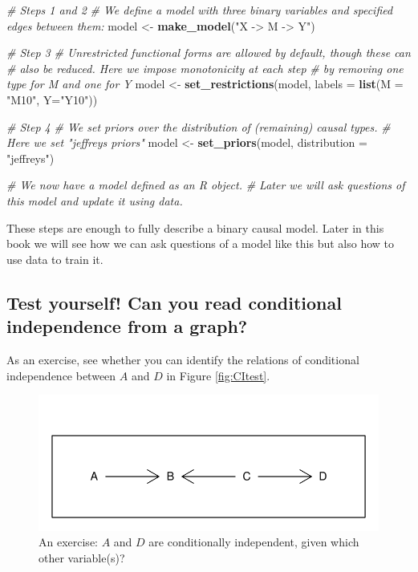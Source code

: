 \documentclass[12pt,]{book}
\newenvironment{Shaded}{\begin{snugshade}}{\end{snugshade}}
\newcommand{\CommentTok}[1]{\textcolor[rgb]{0.56,0.35,0.01}{\textit{#1}}}
\newcommand{\DataTypeTok}[1]{\textcolor[rgb]{0.13,0.29,0.53}{#1}}
\newcommand{\KeywordTok}[1]{\textcolor[rgb]{0.13,0.29,0.53}{\textbf{#1}}}
\newcommand{\NormalTok}[1]{#1}
\newcommand{\StringTok}[1]{\textcolor[rgb]{0.31,0.60,0.02}{#1}}
\begin{document}
\begin{Shaded}
\begin{Highlighting}[]
\CommentTok{# Steps 1 and 2 }
\CommentTok{# We define a model with three binary variables and specified edges between them:}
\NormalTok{model <-}\StringTok{ }\KeywordTok{make_model}\NormalTok{(}\StringTok{"X -> M -> Y"}\NormalTok{)}

\CommentTok{# Step 3}
\CommentTok{# Unrestricted functional forms are allowed by default, though these can }
\CommentTok{# also be reduced. Here we impose monotonicity at each step }
\CommentTok{# by removing one type for M and one for Y}
\NormalTok{model <-}\StringTok{ }\KeywordTok{set_restrictions}\NormalTok{(model, }\DataTypeTok{labels =} \KeywordTok{list}\NormalTok{(}\DataTypeTok{M =} \StringTok{"M10"}\NormalTok{, }\DataTypeTok{Y=}\StringTok{"Y10"}\NormalTok{))}

\CommentTok{# Step 4}
\CommentTok{# We set priors over the distribution of (remaining) causal types.}
\CommentTok{# Here we set "jeffreys priors"}
\NormalTok{model <-}\StringTok{ }\KeywordTok{set_priors}\NormalTok{(model, }\DataTypeTok{distribution =} \StringTok{"jeffreys"}\NormalTok{)}

\CommentTok{# We now have a model defined as an R object. }
\CommentTok{# Later we will ask questions of this model and update it using data.}
\end{Highlighting}
\end{Shaded}

These steps are enough to fully describe a binary causal model. Later in this book we will see how we can ask questions of a model like this but also how to use data to train it.

\hypertarget{test-yourself-can-you-read-conditional-independence-from-a-graph}{%
\subsection{Test yourself! Can you read conditional independence from a graph?}\label{test-yourself-can-you-read-conditional-independence-from-a-graph}}

As an exercise, see whether you can identify the relations of conditional independence between \(A\) and \(D\) in Figure \ref{fig:CItest}.

\begin{figure}

{\centering \includegraphics[width=.9\textwidth]{ii_files/figure-latex/unnamed-chunk-10-1} 

}

\caption{\label{fig:CItest} An exercise: $A$ and $D$ are conditionally independent, given which other variable(s)?}\label{fig:unnamed-chunk-10}
\end{figure}
\end{document}
